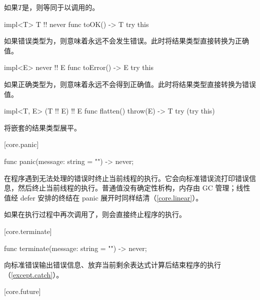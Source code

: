 \pnum
如果$T$是，则等同于以调用的。

\begin{itemdecl}
impl<T> T !! never {
    func toOK() -> T {
        try this
    }
}
\end{itemdecl}

\pnum
如果错误类型为，则意味着永远不会发生错误。此时将结果类型直接转换为正确值。

\begin{itemdecl}
impl<E> never !! E {
    func toError() -> E {
        try this
    }
}
\end{itemdecl}

\pnum
如果正确类型为，则意味着永远不会得到正确值。此时将结果类型直接转换为错误值。

\begin{itemdecl}
impl<T, E> (T !! E) !! E {
    func flatten() throw(E) -> T {
        try (try this)
    }
}
\end{itemdecl}

\pnum
{}将嵌套的结果类型展平。

[core.panic]{}

\begin{itemdecl}
func panic(message: string = "") -> never;
\end{itemdecl}

\pnum
{}在程序遇到无法处理的错误时终止当前线程的执行。它会向标准错误流打印错误信息，然后终止当前线程的执行。普通值没有确定性析构，内存由 GC 管理；线性值经 defer 安排的终结在 panic 展开时同样结清（\ref{core.linear}）。

\pnum
如果在执行过程中再次调用了，则会直接终止程序的执行。

[core.terminate]{}

\begin{itemdecl}
func terminate(message: string = "") -> never;
\end{itemdecl}

\pnum
{}向标准错误输出错误信息、放弃当前剩余表达式计算后结束程序的执行（\ref{except.catch}）。

[core.future]{}

